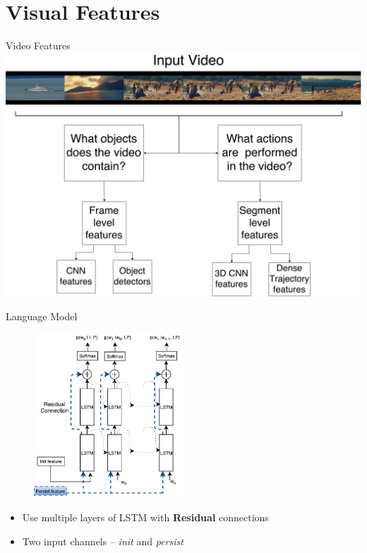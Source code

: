 \documentclass{beamer}
\begin{document}
\section{Visual Features}
\begin{frame}{Video Features}
    \centering
    \includegraphics[width=1.0\textwidth]{images/VideoFeatures.pdf}
\end{frame}
\begin{frame}{Language Model}
    \begin{figure}[h]
        \centering
        \includegraphics[width=0.5\textwidth]{images/MultilayerResidualLSTM.pdf}
    \end{figure}
    \begin{itemize}
        \item Use multiple layers of LSTM with \textbf{Residual} connections~\cite{He2015} 
        \item Two input channels -- \emph{init} and \emph{persist} 
    \end{itemize}
\end{frame}
\end{document}

